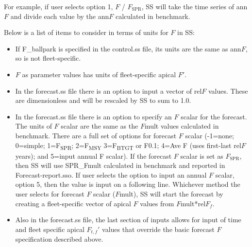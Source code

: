 For example, if user selects option 1, $F$ / $F_\text{SPR}$, SS will take the time series of ann$F$ and divide each value by the ann$F$ calculated in benchmark.

Below is a list of items to consider in terms of units for $F$ in SS:
\begin{itemize}
	\item If F\_ballpark is specified in the control.ss file, its units are the same as ann$F$, so is not fleet-specific.
	
	\item $F$ as parameter values has units of fleet-specific apical $F'$.
	
	\item In the forecast.ss file there is an option to input a vector of rel$F$ values. These are dimensionless and will be rescaled by SS to sum to 1.0.
	
	\item In the forecast.ss file there is an option to specify an $F$ scalar for the forecast.  The units of $F$ scalar are the same as the $F$mult values calculated in benchmark.  There are a full set of options for forecast $F$ scalar (-1=none; 0=simple; 1=F\textsubscript{SPR}; 2=F\textsubscript{MSY} 3=F\textsubscript{BTGT} or F0.1; 4=Ave F (uses first-last rel$F$ years); and 5=input annual F scalar). If the forecast $F$ scalar is set as $F_\text{SPR}$, then SS will use SPR\_Fmult calculated in benchmark and reported in Forecast-report.sso.  If user selects the option to input an annual $F$ scalar, option 5, then the value is input on a following line.  Whichever method the user selects for forecast $F$ scalar ($F$mult), SS will start the forecast by creating a fleet-specific vector of apical $F$ values from $F$mult*rel$F_f$.
	
	\item Also in the forecast.ss file, the last section of inputs allows for input of time and fleet specific apical $F_{t,f}'$ values that override the basic forecast $F$ specification described above.
\end{itemize}
